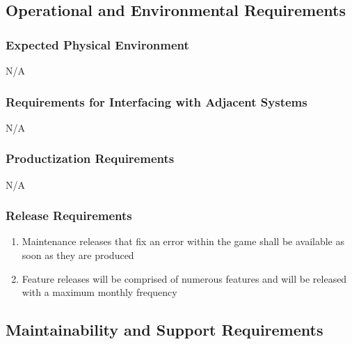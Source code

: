 \documentclass[12pt, titlepage]{article}
\begin{document}

\subsection{Operational and Environmental Requirements}
\label{sub:operational_and_environmental_requirements}

\subsubsection{Expected Physical Environment}
\label{ssub:expected_physical_environment}
N/A

\subsubsection{Requirements for Interfacing with Adjacent Systems}
\label{ssub:requirements_for_interfacing_with_adjacent_systems}
N/A

\subsubsection{Productization Requirements}
\label{ssub:productization_requirements}
N/A

\subsubsection{Release Requirements}
\label{ssub:release_requirements}
\begin{enumerate}[{OE}1. ]
	\item Maintenance releases that fix an error within the game shall be available as soon as they are produced
	\item Feature releases will be comprised of numerous features and will be released with a maximum monthly frequency
\end{enumerate}


\subsection{Maintainability and Support Requirements}
\label{sub:maintainability_and_support_requirements}
\end{document}
